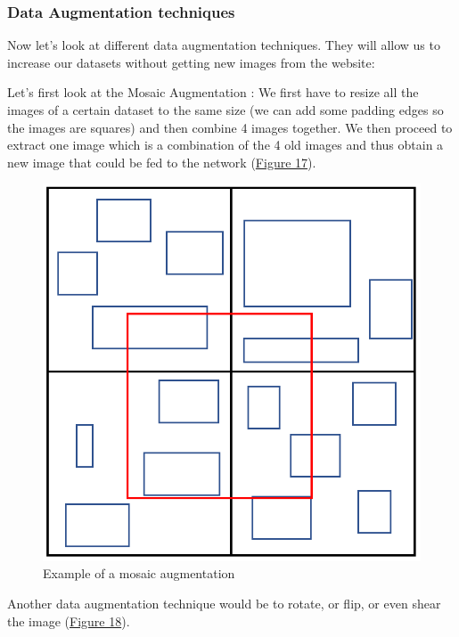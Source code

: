 \documentclass{article}
\begin{document}
\bigskip

\subsubsection{Data Augmentation techniques}

Now let's look at different data augmentation techniques. They will allow us to increase our datasets without getting new images from the website: 

\bigskip

Let's first look at the Mosaic Augmentation :
We first have to resize all the images of a certain dataset to the same size (we can add some padding edges so the images are squares) and then combine 4 images together. We then proceed to extract one image which is a combination of the 4 old images and thus obtain a new image that could be fed to the network (\hyperref[Figure 17]{Figure 17}).

\begin{figure}[!ht]
  \centering
  \includegraphics[scale=0.75]{dataset/mosaic.PNG}
  \caption{Example of a mosaic augmentation}
  \label{Figure 17}
\end{figure}

\newpage

Another data augmentation technique would be to rotate, or flip, or even shear the image (\hyperref[Figure 18]{Figure 18}). 
\end{document}
